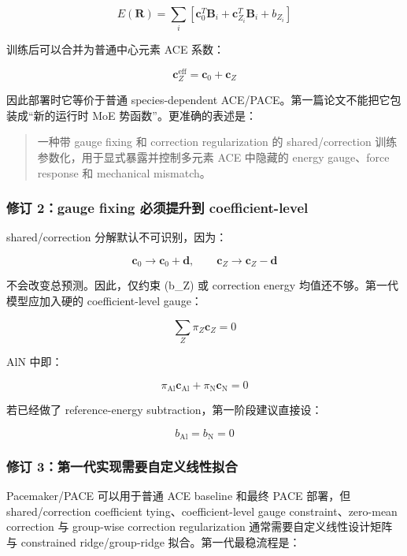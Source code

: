 \documentclass[
  12pt,
]{ctexart}
\begin{document}
\[
E(\mathbf R)=\sum_i\left[
\mathbf c_0^T\mathbf B_i+\mathbf c_{Z_i}^T\mathbf B_i+b_{Z_i}
\right]
\]

训练后可以合并为普通中心元素 ACE 系数：

\[
\mathbf c_Z^{\mathrm{eff}}=\mathbf c_0+\mathbf c_Z
\]

因此部署时它等价于普通 species-dependent
ACE/PACE。第一篇论文不能把它包装成``新的运行时 MoE
势函数''。更准确的表述是：

\begin{quote}
一种带 gauge fixing 和 correction regularization 的 shared/correction
训练参数化，用于显式暴露并控制多元素 ACE 中隐藏的 energy gauge、force
response 和 mechanical mismatch。
\end{quote}

\subsubsection{修订 2：gauge fixing 必须提升到
coefficient-level}\label{ux4feeux8ba2-2gauge-fixing-ux5fc5ux987bux63d0ux5347ux5230-coefficient-level}

shared/correction 分解默认不可识别，因为：

\[
\mathbf c_0\rightarrow \mathbf c_0+\mathbf d,
\qquad
\mathbf c_Z\rightarrow \mathbf c_Z-\mathbf d
\]

不会改变总预测。因此，仅约束 (b\_Z) 或 correction energy
均值还不够。第一代模型应加入硬的 coefficient-level gauge：

\[
\sum_Z \pi_Z\mathbf c_Z=0
\]

AlN 中即：

\[
\pi_{\mathrm{Al}}\mathbf c_{\mathrm{Al}}
+
\pi_{\mathrm{N}}\mathbf c_{\mathrm{N}}=0
\]

若已经做了 reference-energy subtraction，第一阶段建议直接设：

\[
b_{\mathrm{Al}}=b_{\mathrm{N}}=0
\]

\subsubsection{修订
3：第一代实现需要自定义线性拟合}\label{ux4feeux8ba2-3ux7b2cux4e00ux4ee3ux5b9eux73b0ux9700ux8981ux81eaux5b9aux4e49ux7ebfux6027ux62dfux5408}

Pacemaker/PACE 可以用于普通 ACE baseline 和最终 PACE 部署，但
shared/correction coefficient tying、coefficient-level gauge
constraint、zero-mean correction 与 group-wise correction regularization
通常需要自定义线性设计矩阵与 constrained ridge/group-ridge
拟合。第一代最稳流程是：
\end{document}

